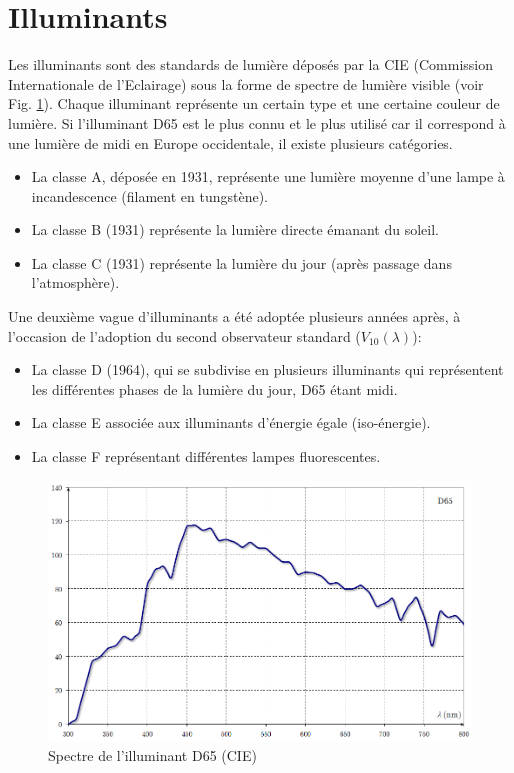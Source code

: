 	\section{Illuminants}
	\par Les illuminants sont des standards de lumière déposés par la CIE (Commission Internationale de l'Eclairage) sous la forme de spectre de lumière visible (voir Fig. \ref{fig:illuminant_d65}). Chaque illuminant représente un certain type et une certaine couleur de lumière. Si l'illuminant D65 est le plus connu et le plus utilisé car il correspond à une lumière de midi en Europe occidentale, il existe plusieurs catégories.
	\begin{itemize}
	\item La classe A, déposée en 1931, représente une lumière moyenne d'une lampe à incandescence (filament en tungstène).
	\item La classe B (1931) représente la lumière directe émanant du soleil.
	\item La classe C (1931) représente la lumière du jour (après passage dans l'atmosphère).
	\end{itemize}

	\par Une deuxième vague d'illuminants a été adoptée plusieurs années après, à l'occasion de l'adoption du second observateur standard ($V_{10}(\lambda)$):
	\begin{itemize}
	\item La classe D (1964), qui se subdivise en plusieurs illuminants qui représentent les différentes phases de la lumière du jour, D65 étant midi.
	\item La classe E associée aux illuminants d'énergie égale (iso-énergie).
	\item La classe F représentant différentes lampes fluorescentes.
	\end{itemize}
	
	\begin{figure}
		\centering
		\includegraphics[scale=0.45]{Figures/IlluminantD65}
		\caption{Spectre de l'illuminant D65 (CIE)}
		\label{fig:illuminant_d65}
	\end{figure}
	
